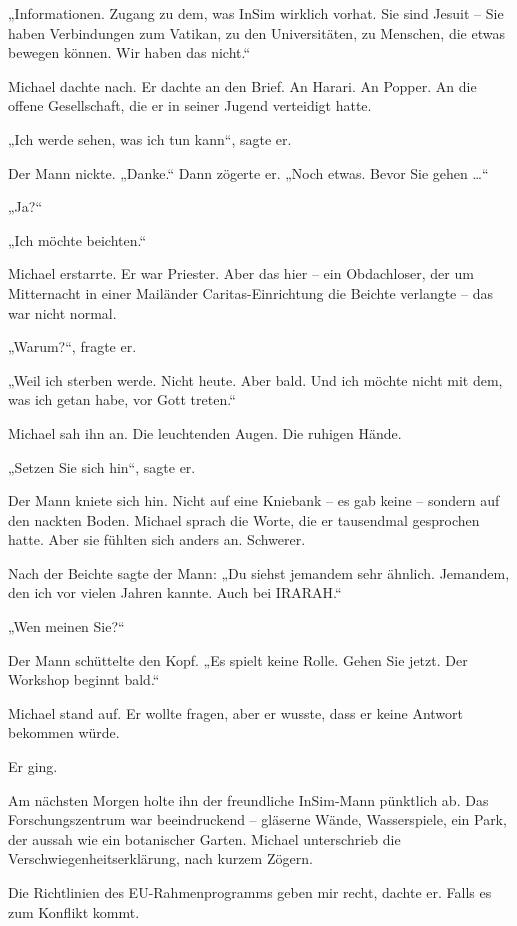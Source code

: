 \documentclass[
]{article}
\begin{document}
„Informationen. Zugang zu dem, was InSim wirklich vorhat. Sie sind Jesuit -- Sie haben Verbindungen zum Vatikan, zu den Universitäten, zu Menschen, die etwas bewegen können. Wir haben das nicht.``

Michael dachte nach. Er dachte an den Brief. An Harari. An Popper. An die offene Gesellschaft, die er in seiner Jugend verteidigt hatte.

„Ich werde sehen, was ich tun kann``, sagte er.

Der Mann nickte. „Danke.`` Dann zögerte er. „Noch etwas. Bevor Sie gehen \ldots``

„Ja?{\kern0pt}``

„Ich möchte beichten.``

Michael erstarrte. Er war Priester. Aber das hier -- ein Obdachloser, der um Mitternacht in einer Mailänder Caritas-Einrichtung die Beichte verlangte -- das war nicht normal.

„Warum?{\kern0pt}``, fragte er.

„Weil ich sterben werde. Nicht heute. Aber bald. Und ich möchte nicht mit dem, was ich getan habe, vor Gott treten.``

Michael sah ihn an. Die leuchtenden Augen. Die ruhigen Hände.

„Setzen Sie sich hin``, sagte er.

Der Mann kniete sich hin. Nicht auf eine Kniebank -- es gab keine -- sondern auf den nackten Boden. Michael sprach die Worte, die er tausendmal gesprochen hatte. Aber sie fühlten sich anders an. Schwerer.

Nach der Beichte sagte der Mann: „Du siehst jemandem sehr ähnlich. Jemandem, den ich vor vielen Jahren kannte. Auch bei IRARAH.``

„Wen meinen Sie?{\kern0pt}``

Der Mann schüttelte den Kopf. „Es spielt keine Rolle. Gehen Sie jetzt. Der Workshop beginnt bald.``

Michael stand auf. Er wollte fragen, aber er wusste, dass er keine Antwort bekommen würde.

Er ging.

Am nächsten Morgen holte ihn der freundliche InSim-Mann pünktlich ab. Das Forschungszentrum war beeindruckend -- gläserne Wände, Wasserspiele, ein Park, der aussah wie ein botanischer Garten. Michael unterschrieb die Verschwiegenheitserklärung, nach kurzem Zögern.

Die Richtlinien des EU-Rahmenprogramms geben mir recht, dachte er. Falls es zum Konflikt kommt.
\end{document}
